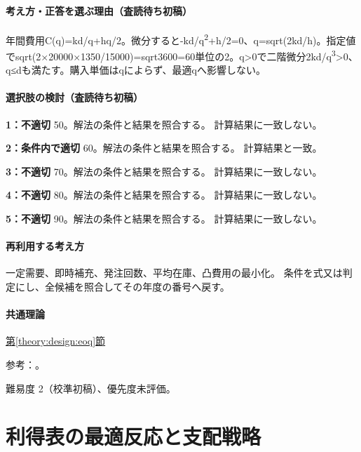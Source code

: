 \paragraph{考え方・正答を選ぶ理由（査読待ち初稿）} 年間費用C(q)=\allowbreak{}kd/q+hq/2。微分すると-kd/q\textsuperscript{2}+h/2=\allowbreak{}0、q=\allowbreak{}sqrt(2kd/h)。指定値でsqrt(2×20000×1350/15000)=\allowbreak{}sqrt3600=\allowbreak{}60単位の2。q>0で二階微分2kd/q\textsuperscript{3}>0、q≤dも満たす。購入単価はqによらず、最適qへ影響しない。

\paragraph{選択肢の検討（査読待ち初稿）}\mbox{}\par

\noindent\textbf{1：不適切} 50。解法の条件と結果を照合する。 計算結果に一致しない。\par

\noindent\textbf{2：条件内で適切} 60。解法の条件と結果を照合する。 計算結果と一致。\par

\noindent\textbf{3：不適切} 70。解法の条件と結果を照合する。 計算結果に一致しない。\par

\noindent\textbf{4：不適切} 80。解法の条件と結果を照合する。 計算結果に一致しない。\par

\noindent\textbf{5：不適切} 90。解法の条件と結果を照合する。 計算結果に一致しない。\par

\paragraph{再利用する考え方} 一定需要、即時補充、発注回数、平均在庫、凸費用の最小化。 条件を式又は判定にし、全候補を照合してその年度の番号へ戻す。

\paragraph{共通理論} \hyperref[theory:design:eoq]{第\ref*{theory:design:eoq}節}

\par 参考：\cite{finish56_eoq}。

\par 難易度 2（校準初稿）、優先度未評価。

\section{利得表の最適反応と支配戦略}

